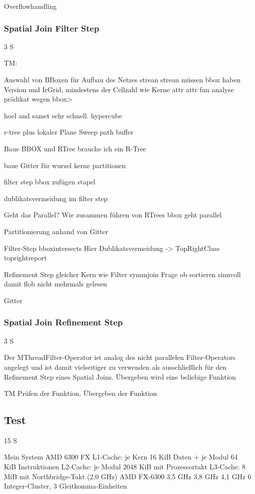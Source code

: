 \documentclass[a4paper,12pt,twoside]{article}
\begin{document}
Overflowhandling

\subsubsection{Spatial Join Filter Step} 3 S




TM:

Auswahl von BBoxen für Aufbau des Netzes
strean strean müssen bbox haben Version und IrGrid, mindestens der Cellzahl wie Kerne
attr attr fun
analyse prädikat wegen bbox>

hoel and samet sehr schnell. hypercube

r-tree plus lokaler Plane Sweep
path buffer


Baue BBOX und RTree
brauche ich ein R-Tree

baue Gitter für wurzel kerne partitionen

filter step bbox zufügen stapel

dublikatsvermeidung im filter step

Geht das Parallel? Wie zusammen führen von RTrees
bbox geht parallel

Partitionierung
anhand von Gitter

Filter-Step
bboxintersects
Hier Dublikatsvermeidung -> TopRightClass
toprightreport

Refinement Step gleicher Kern wie Filter
symmjoin
Frage ob sortieren sinnvoll damit flob nicht mehrmals gelesen

Gitter

\subsubsection{Spatial Join Refinement Step} 3 S

Der MThreadFilter-Operator ist analog des nicht parallelen Filter-Operators angelegt und ist damit vielseitiger zu verwenden als ausschließlich für den Refinement Step eines Spatial Joins. Übergeben wird eine beliebige Funktion

TM Prüfen der Funktion, Übergeben der Funktion

\subsection{Test} 15 S

Mein System AMD 6300 FX
L1-Cache: je Kern 16 KiB Daten + je Modul 64 KiB Instruktionen
L2-Cache: je Modul 2048 KiB mit Prozessortakt
L3-Cache: 8 MiB mit Northbridge-Takt (2,0 GHz)
AMD FX-6300 	3,5 GHz 	3,8 GHz 	4,1 GHz
6 Integer-Cluster, 3 Gleitkomma-Einheiten
\end{document}
